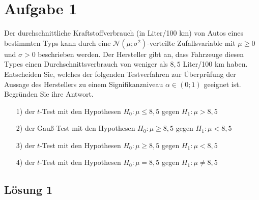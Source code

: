 \documentclass[main.tex]{subfiles}
\begin{document}
\section{Aufgabe 1}
Der durchschnittliche Kraftstoffverbrauch (in Liter/100 km) von Autos eines bestimmten Typs kann durch eine $\mathcal{N}(\mu; \sigma^2)$-verteilte Zufallsvariable mit $\mu \geq 0$ und $\sigma > 0$ beschrieben werden. Der Hersteller gibt an, dass Fahrzeuge diesen Types einen Durchschnittsverbrauch von weniger als $8,5$ Liter/100 km haben. \\[2mm]
%
Entscheiden Sie, welches der folgenden Testverfahren zur Überprüfung der Aussage des Herstellers zu einem Signifikanzniveau $\alpha \in (0;1)$ geeignet ist. Begründen Sie ihre Antwort.
\begin{enumerate}
	\item[1)] der $t$-Test mit den Hypothesen $H_0: \mu \leq 8,5$ gegen $H_1: \mu > 8,5$
	\item[2)] der Gauß-Test mit den Hypothesen $H_0: \mu \geq 8,5$ gegen $H_1: \mu < 8,5$
	\item[3)] der $t$-Test mit den Hypothesen $H_0: \mu \geq 8,5$ gegen $H_1: \mu < 8,5$
	\item[4)] der $t$-Test mit den Hypothesen $H_0: \mu = 8,5$ gegen $H_1: \mu \neq 8,5$
\end{enumerate}

\subsection{Lösung 1}
\end{document}
